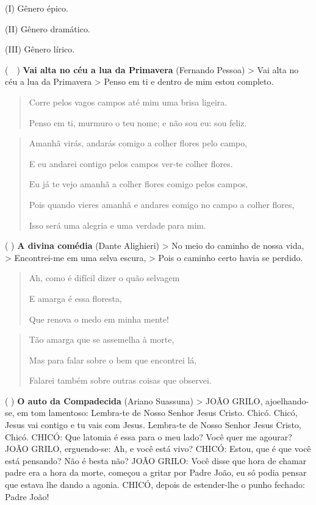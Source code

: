 \begin{multicols}{2}
(I) Gênero épico. 

(II) Gênero dramático.

(III) Gênero lírico.

\columnbreak

(~~) \textbf{Vai alta no céu a lua da Primavera} (Fernando
Pessoa) \textgreater{} Vai alta no céu a lua da Primavera \textgreater{}
Penso em ti e dentro de mim estou completo.

\begin{quote}
Corre pelos vagos campos até mim uma brisa ligeira.

Penso em ti, murmuro o teu nome; e não sou eu: sou feliz.
\end{quote}

\begin{quote}
Amanhã virás, andarás comigo a colher flores pelo campo,

E eu andarei contigo pelos campos ver-te colher flores.

Eu já te vejo amanhã a colher flores comigo pelos campos,

Pois quando vieres amanhã e andares comigo no campo a colher flores,

Isso será uma alegria e uma verdade para mim.
\end{quote}

(  ) \textbf{A divina comédia} (Dante Alighieri)
\textgreater{} No meio do caminho de nossa vida, \textgreater{}
Encontrei-me em uma selva escura, \textgreater{} Pois o caminho certo
havia se perdido.

\begin{quote}
Ah, como é difícil dizer o quão selvagem

E amarga é essa floresta,

Que renova o medo em minha mente!
\end{quote}

\begin{quote}
Tão amarga que se assemelha à morte,

Mas para falar sobre o bem que encontrei lá,

Falarei também sobre outras coisas que observei.
\end{quote}

(  ) \textbf{O auto da Compadecida} (Ariano Suassuna)
\textgreater{} JOÃO GRILO, ajoelhando-se, em tom lamentoso: Lembra-te de
Nosso Senhor Jesus Cristo. Chicó. Chicó, Jesus vai contigo e tu vais com
Jesus. Lembra-te de Nosso Senhor Jesus Cristo, Chicó. CHICÓ: Que latomia
é essa para o meu lado? Você quer me agourar? JOÃO GRILO, erguendo-se:
Ah, e você está vivo? CHICÓ: Estou, que é que você está pensando? Não é
besta não? JOÃO GRILO: Você disse que hora de chamar padre era a hora da
morte, começou a gritar por Padre João, eu só podia pensar que estava
lhe dando a agonia. CHICÓ, depois de estender-lhe o punho fechado: Padre
João!
\end{multicols}

